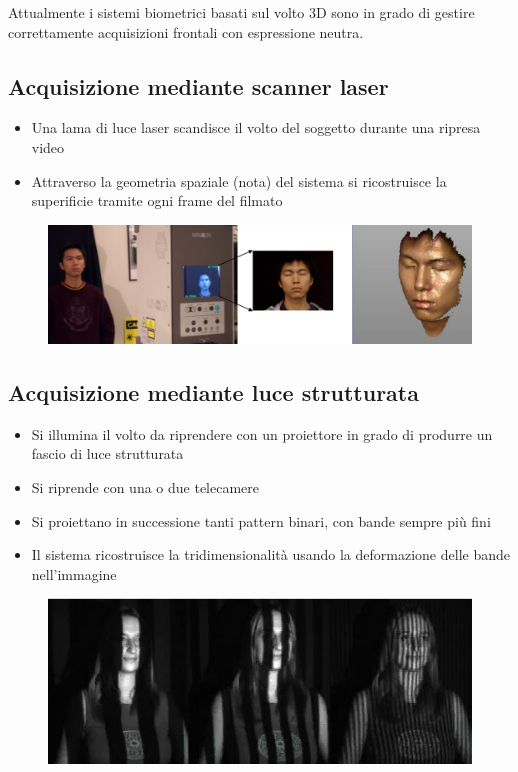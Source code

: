 \documentclass{report}
\begin{document}
Attualmente i sistemi biometrici basati sul volto 3D sono in grado di gestire
correttamente acquisizioni frontali con espressione neutra.

\subsection{Acquisizione mediante scanner laser}

\begin{itemize}
    \item Una lama di luce laser scandisce il volto del soggetto durante una ripresa video
    \item Attraverso la geometria spaziale (nota) del sistema si 
    ricostruisce la superificie tramite ogni frame del filmato
\end{itemize}

\begin{figure}[ht]
    \centering
    \includegraphics[width=1\linewidth]{images/laser3D.png}
\end{figure}


\subsection{Acquisizione mediante luce strutturata}
\begin{itemize}
    \item Si illumina il volto da riprendere con un proiettore in 
    grado di produrre un fascio di luce strutturata
    \item Si riprende con una o due telecamere
    \item Si proiettano in successione tanti pattern binari, con bande sempre più fini
    \item Il sistema ricostruisce la tridimensionalità usando la deformazione 
    delle bande nell'immagine
\end{itemize}

\begin{figure}[ht]
    \centering
    \includegraphics[width=0.67\linewidth]{images/luce-strutturata.png}
\end{figure}
\end{document}
